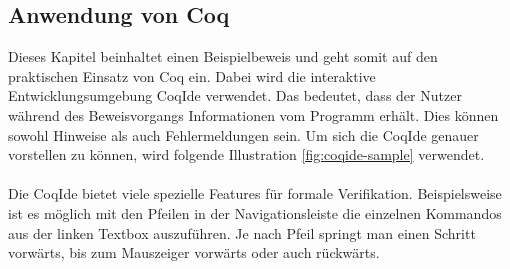 \subsection{Anwendung von Coq}
Dieses Kapitel beinhaltet einen Beispielbeweis und geht somit auf den praktischen Einsatz von Coq ein. Dabei wird die interaktive Entwicklungsumgebung CoqIde verwendet. Das bedeutet, dass der Nutzer während des Beweisvorgangs Informationen vom Programm erhält. Dies können sowohl Hinweise als auch Fehlermeldungen sein. Um sich die CoqIde genauer vorstellen zu können, wird folgende Illustration \ref{fig:coqide-sample} verwendet.\\
\\
Die CoqIde bietet viele spezielle Features für formale Verifikation. Beispielsweise ist es möglich mit den Pfeilen in der Navigationsleiste die einzelnen Kommandos aus der linken Textbox auszuführen. Je nach Pfeil springt man einen Schritt vorwärts, bis zum Mauszeiger vorwärts oder auch rückwärts.\\

